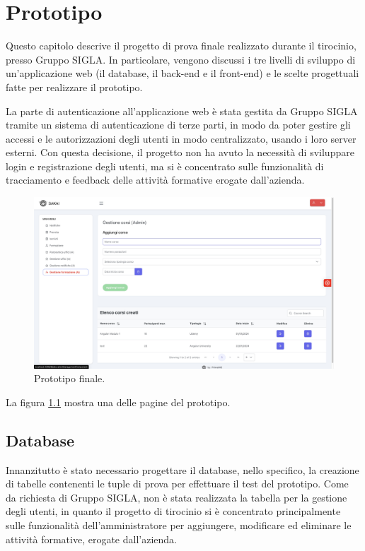 \chapter{Prototipo}\label{ch:prototipo}
Questo capitolo descrive il progetto di prova finale realizzato durante il tirocinio, presso Gruppo SIGLA. In particolare, vengono discussi i tre livelli di sviluppo di un'applicazione web (il database, il back-end e il front-end) e le scelte progettuali fatte per realizzare il prototipo.

La parte di autenticazione all'applicazione web è stata gestita da Gruppo SIGLA tramite un sistema di autenticazione di terze parti, in modo da poter gestire gli accessi e le autorizzazioni degli utenti in modo centralizzato, usando i loro server esterni. Con questa decisione, il progetto non ha avuto la necessità di sviluppare login e registrazione degli utenti, ma si è concentrato sulle funzionalità di tracciamento e feedback delle attività formative erogate dall'azienda.

\begin{figure}[H]
\centering
\includegraphics[width=1\textwidth]{Images/portale.jpg}
\caption{\label{fig:portale}Prototipo finale.}
\end{figure}

La figura \ref{fig:portale} mostra una delle pagine del prototipo.

\section{Database}\label{sec:database}
Innanzitutto è stato necessario progettare il database, nello specifico, la creazione di tabelle contenenti le tuple di prova per effettuare il test del prototipo. 
Come da richiesta di Gruppo SIGLA, non è stata realizzata la tabella per la gestione degli utenti, in quanto il progetto di tirocinio si è concentrato principalmente sulle funzionalità dell'amministratore per aggiungere, modificare ed eliminare le attività formative, erogate dall'azienda.

